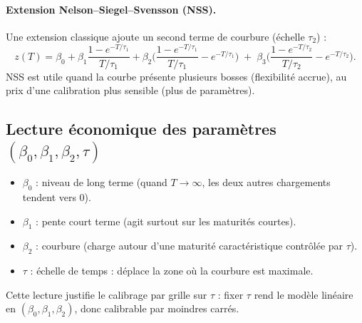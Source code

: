 \documentclass[11pt,a4paper]{report}
\theoremstyle{definition}
\theoremstyle{plain}
\theoremstyle{remark}
\newcommand{\1}{\mathbf{1}}
\begin{document}
\paragraph{Extension Nelson--Siegel--Svensson (NSS).}
Une extension classique ajoute un second terme de courbure (échelle $\tau_2$) :
\[
z(T)=\beta_0+\beta_1\frac{1-e^{-T/\tau_1}}{T/\tau_1}+\beta_2\Big(\frac{1-e^{-T/\tau_1}}{T/\tau_1}-e^{-T/\tau_1}\Big)
\;+\;\beta_3\Big(\frac{1-e^{-T/\tau_2}}{T/\tau_2}-e^{-T/\tau_2}\Big).
\]
NSS est utile quand la courbe présente plusieurs bosses (flexibilité accrue), au prix d'une calibration plus sensible (plus de paramètres).

\subsection*{Lecture économique des paramètres $(\beta_0,\beta_1,\beta_2,\tau)$}
\begin{itemize}[leftmargin=*]
\item $\beta_0$ : niveau de long terme (quand $T\to\infty$, les deux autres chargements tendent vers 0).
\item $\beta_1$ : pente court terme (agit surtout sur les maturités courtes).
\item $\beta_2$ : courbure (charge autour d'une maturité caractéristique contrôlée par $\tau$).
\item $\tau$ : échelle de temps : déplace la zone où la courbure est maximale.
\end{itemize}
Cette lecture justifie le calibrage par grille sur $\tau$ : fixer $\tau$ rend le modèle linéaire en $(\beta_0,\beta_1,\beta_2)$, donc calibrable par moindres carrés.
\end{document}
